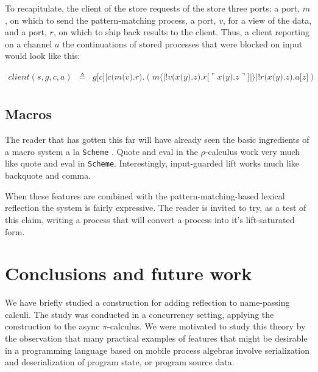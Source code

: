 \documentclass[]{amsart}
\newcommand{\lliftb}{\langle\!|}
\newcommand{\rliftb}{|\!\rangle}
\newcommand{\lpquote}{\ulcorner}
\newcommand{\rpquote}{\urcorner}
\newcommand{\id}[1]{\texttt{#1}}
\newcommand{\pzero}{\mathbin{0}}
\newcommand{\juxtap}{\mathbin{\id{|}}}
\newcommand{\concat}{\mathbin{\id{.}}}
\newcommand{\binpar}[2]{#1 \juxtap #2}
\newcommand{\outputp}[2]{#1 \id{[} #2 \id{]}}
\newcommand{\prefix}[3]{#1 \id{(} #2 \id{)} \concat #3}
\newcommand{\lift}[2]{#1 \lliftb #2 \rliftb}
\newcommand{\quotep}[1]{\lpquote #1 \rpquote}
\newcommand{\dropn}[1]{\rpquote #1 \lpquote}
\theoremstyle{definition}
\theoremstyle{remark}
\numberwithin{equation}{subsection}
\newcommand{\pic}{$\pi$-calculus}
\newcommand{\rhoc}{$\rho$-calculus}
\begin{document}
To recapitulate, the client of the store requests of the store three
ports: a port, $m$, on which to send the pattern-matching process, a
port, $v$, for a view of the data, and a port, $r$, on which to ship
back results to the client. Thus, a client reporting on a channel $a$
the continuations of stored processes that were blocked on input would
look like this:

\begin{eqnarray*}
	client( s, g, c, a ) & \triangleq & 
	 \outputp{g}{c} 
	  \juxtap \prefix{c}
			 {\prefix{m}{v}{r}}
			 {(\lift{m}{!\prefix{v}{\prefix{x}{y}{z}}{\outputp{r}{\quotep{\prefix{x}{y}{z}}}}} 
			   \juxtap !\prefix{r}{\prefix{x}{y}{z}}{\outputp{a}{z}})} \\
\end{eqnarray*}

\subsection{Macros}

The reader that has gotten this far will have already seen the basic
ingredients of a macro system a la \texttt{Scheme} \cite{r5rs}. Quote
and eval in the {\rhoc} work very much like quote and eval in
\texttt{Scheme}. Interestingly, input-guarded lift works much like
backquote and comma. 

When these features are combined with the pattern-matching-based
lexical reflection the system is fairly expressive. The reader is
invited to try, as a test of this claim, writing a process that will
convert a process into it's lift-saturated form.

\section{Conclusions and future work}

We have briefly studied a construction for adding reflection to
name-passing calculi. The study was conducted in a concurrency
setting, applying the construction to the async {\pic}. We were
motivated to study this theory by the observation that many practical
examples of features that might be desirable in a programming language
based on mobile process algebras involve serialization and
deserialization of program state, or program source data.
\end{document}
